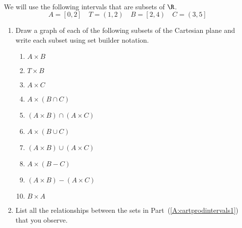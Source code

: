 \begin{prog}\label{prog:cartprodintervals} \hfill \\
We will use the following intervals that are subsets of  $\R$.
\[
A = \left[ {0,2} \right] \quad T = \left( {1,2} \right) \quad B = \left[ {2,4} \right) \quad C = \left( {3,5} \right]
\]
%
\begin{enumerate}
\item Draw a graph of each of the following subsets of the Cartesian plane and write each subset using set builder notation.  \label{A:cartprodintervals1}
\begin{multicols}{2}
\begin{enumerate}
  \item $A \times B$
  \item $T \times B$
  \item $A \times C$
  \item $A \times \left( {B \cap C} \right)$
  \item $\left( {A \times B} \right) \cap \left( {A \times C} \right)$
  \item $A \times \left( {B \cup C} \right)$
  \item $\left( {A \times B} \right) \cup \left( {A \times C} \right)$
  \item $A \times \left( {B - C} \right)$
  \item $\left( {A \times B} \right) - \left( {A \times C} \right)$
  \item $B \times A$
\end{enumerate}
\end{multicols}
%
\item List all the relationships between the sets in Part~(\ref{A:cartprodintervals1}) that you observe.
\end{enumerate}
\end{prog}
\hbreak

\endinput
